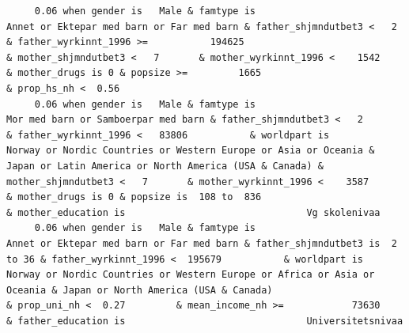 \documentclass[
  letterpaper,
  DIV=11,
  numbers=noendperiod]{scrreprt}
\begin{document}
\begin{verbatim}
     0.06 when gender is   Male & famtype is                        Annet or Ektepar med barn or Far med barn & father_shjmndutbet3 <   2       & father_wyrkinnt_1996 >=           194625                                                                                                                                                    & mother_shjmndutbet3 <   7       & mother_wyrkinnt_1996 <    1542           & mother_drugs is 0 & popsize >=         1665                                                                    & prop_hs_nh <  0.56                                                                                                                                                                                                                                                                                                                       
     0.06 when gender is   Male & famtype is                              Mor med barn or Samboerpar med barn & father_shjmndutbet3 <   2       & father_wyrkinnt_1996 <   83806           & worldpart is            Norway or Nordic Countries or Western Europe or Asia or Oceania & Japan or Latin America or North America (USA & Canada) & mother_shjmndutbet3 <   7       & mother_wyrkinnt_1996 <    3587           & mother_drugs is 0 & popsize is  108 to  836                                                                                                                                                                        & mother_education is                                Vg skolenivaa                                                                                                                                                                     
     0.06 when gender is   Male & famtype is                        Annet or Ektepar med barn or Far med barn & father_shjmndutbet3 is  2 to 36 & father_wyrkinnt_1996 <  195679           & worldpart is                   Norway or Nordic Countries or Western Europe or Africa or Asia or Oceania & Japan or North America (USA & Canada)                                                                                                                            & prop_uni_nh <  0.27         & mean_income_nh >=            73630                                                                                                                                                                                                                                                  & father_education is                                Universitetsnivaa                    

\end{verbatim}
\end{document}
